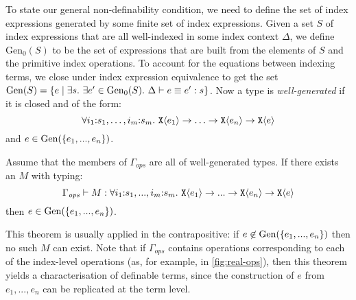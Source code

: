 To state our general non-definability condition, we need to define the
set of index expressions generated by some finite set of index
expressions. Given a set $S$ of index expressions that are all
well-indexed in some index context $\Delta$, we define
$\mathrm{Gen}_0(S)$ to be the set of expressions that are built from
the elements of $S$ and the primitive index operations. To account for
the equations between indexing terms, we close under index expression
equivalence to get the set $\Gen(S) = \{ e \sepbar \exists s.\ \exists
e' \in \mathrm{Gen}_0(S).\ \Delta \vdash e \equiv e' : s \}$. Now a
type is \emph{well-generated} if it is closed and of the form:
\begin{displaymath}
  \forall i_1\mathord:s_1,\ldots,i_m\mathord:s_m.~\textup{\texttt{X}}\langle e_1 \rangle \to \ldots \to \textup{\texttt{X}}\langle e_n \rangle \to \textup{\texttt{X}}\langle e \rangle
\end{displaymath}
and $e \in \mathrm{Gen}(\{e_1,...,e_n\})$.
\begin{theorem}\label{thm:general-nondef}
  Assume that the members of $\Gamma_{\mathit{ops}}$ are all of
  well-generated types. If there exists an $M$ with typing:
  \begin{displaymath}
    \Gamma_{\mathit{ops}} \vdash M : \forall i_1\mathord:s_1,...,i_m\mathord:s_m.~\textup{\texttt{X}}\langle e_1 \rangle \to ... \to \textup{\texttt{X}}\langle e_n \rangle \to \textup{\texttt{X}}\langle e \rangle
  \end{displaymath}
  then $e \in \mathrm{Gen}(\{e_1,...,e_n\})$.
\end{theorem}
This theorem is usually applied in the contrapositive: if $e \not\in
\mathrm{Gen}(\{e_1,...,e_n\})$ then no such $M$ can exist. Note that if
$\Gamma_{\mathit{ops}}$ contains operations corresponding to each of
the index-level operations (as, for example, in
\autoref{fig:real-ops}), then this theorem yields a characterisation
of definable terms, since the construction of $e$ from $e_1,...,e_n$
can be replicated at the term level.

